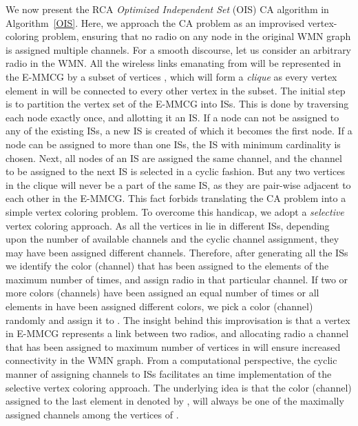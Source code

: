 \documentclass[conference]{IEEEtran}
\begin{document}
We now present the RCA \textit{Optimized Independent Set} (OIS) CA algorithm in Algorithm~\ref{OIS}. Here, we approach the CA problem as an improvised vertex-coloring problem, ensuring that no radio on any node in the original WMN graph  is assigned multiple channels. For a smooth discourse, let us consider an arbitrary radio  in the WMN. All the wireless links emanating from  will be represented in the E-MMCG  by a subset of vertices , which will form a \textit{clique} as every vertex element in  will be connected to every other vertex in the subset. The initial step is to partition the vertex set of the E-MMCG into ISs. This is done by traversing each node exactly once, and allotting it an IS. If a node can not be assigned to any of the existing ISs, a new IS is created of which it becomes the first node. If a node can be assigned to more than one ISs, the IS with minimum cardinality is chosen. Next, all nodes of an IS are assigned the same channel, and the channel to be assigned to 
the next IS is 
selected in a cyclic fashion. But any two vertices in the clique  will never be a part of the same IS, as they are pair-wise adjacent to each other in the E-MMCG. This fact forbids translating the CA problem into a simple vertex coloring problem. To overcome this handicap, we adopt a \textit{selective} vertex coloring approach. As all the vertices in  lie in different ISs, depending upon the number of available channels and the cyclic channel assignment, they may have been assigned different channels. Therefore, after generating all the ISs we identify the color (channel) that has been assigned to the elements of  the maximum number of times, and assign radio  in  that particular channel. If two or more colors (channels) have been assigned an equal number of times or all elements in  have been assigned different colors, we pick a color (channel) randomly and assign it to . The insight behind this improvisation is that a vertex in E-MMCG represents a link between two radios, and 
allocating radio  a channel that has been assigned to maximum number of vertices in  will ensure increased connectivity in the WMN graph. From a computational perspective, the cyclic manner of assigning channels to ISs facilitates an  time implementation of the selective vertex coloring approach. The underlying idea is that the color (channel) assigned to the last element in  denoted by , will always be one of the maximally assigned channels among the vertices of  .\\
\end{document}

